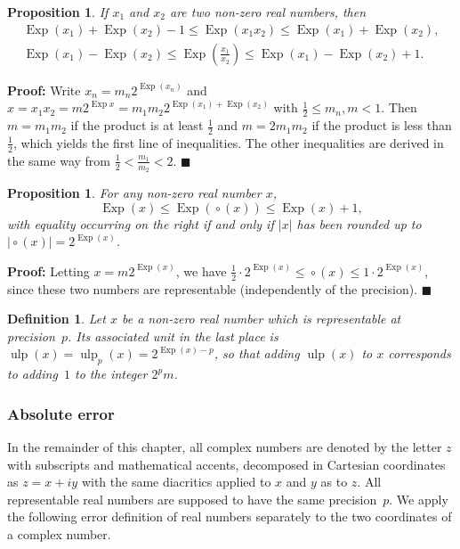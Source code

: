 \documentclass [11pt]{article}
\newcommand {\Ulp}{{\operatorname {ulp}}}
\DeclareMathOperator{\Exp}{\operatorname {Exp}}
\newcommand {\round}{\operatorname {\circ}}
\renewcommand {\leq}{\leqslant}
\newtheorem{definition}[theorem]{Definition}
\newtheorem{prop}[theorem]{Proposition}
\newenvironment{proof}{\noindent \textbf {Proof:}}{{\hspace* {\fill}$\blacksquare$}}
\begin{document}
\begin {prop}
\label {prop:expmuldiv}
If $x_1$ and $x_2$ are two non-zero real numbers, then
\begin {gather*}
\Exp (x_1) + \Exp (x_2) - 1 \leq \Exp (x_1 x_2) \leq \Exp (x_1) + \Exp (x_2),
\\
\Exp (x_1) - \Exp (x_2) \leq \Exp \left( \frac {x_1}{x_2} \right)
\leq \Exp (x_1) - \Exp (x_2) + 1.
\end {gather*}
\end {prop}

\begin {proof}
Write $x_n = m_n 2^{\Exp (x_n)}$ and
$x = x_1 x_2 = m 2^{\Exp x} = m_1 m_2 2^{\Exp (x_1) + \Exp (x_2)}$
with $\frac {1}{2} \leq m_n, m < 1$.
Then $m = m_1 m_2$ if the product is at least $\frac {1}{2}$ and
$m = 2 m_1 m_2$ if the product is less than $\frac {1}{2}$, which
yields the first line of inequalities.
The other inequalities are derived in the same way from
$\frac {1}{2} < \frac {m_1}{m_2} < 2$.
\end {proof}


\begin {prop}
\label {prop:expround}
For any non-zero real number $x$,
\[
\Exp (x) \leq \Exp (\round (x)) \leq \Exp (x) + 1,
\]
with equality occurring on the right if and only if
$|x|$ has been rounded up to $|\round (x)| = 2^{\Exp (x)}$.
\end {prop}

\begin {proof}
Letting $x = m 2^{\Exp (x)}$, we have
$\frac {1}{2} \cdot 2^{\Exp (x)} \leq \round (x) \leq 1 \cdot 2^{\Exp (x)}$,
since these two numbers are representable (independently of the precision).
\end {proof}


\begin {definition}
\label {def:ulp}
Let $x$ be a non-zero real number which is representable at precision~$p$.
Its associated {\em unit in the last place} is
$\Ulp(x) = \Ulp_p (x) = 2^{\Exp(x) - p}$, so that adding $\Ulp(x)$ to $x$
corresponds to adding~$1$ to the integer $2^p m$.
\end {definition}


\subsubsection {Absolute error}

In the remainder of this chapter, all complex numbers are denoted by
the letter $z$ with subscripts and mathematical accents, decomposed in
Cartesian coordinates as $z = x + i y$ with the same diacritics applied
to $x$ and $y$ as to $z$. All representable real numbers are supposed
to have the same precision~$p$. We apply the following error definition
of real numbers separately to the two coordinates of a complex number.
\end{document}

